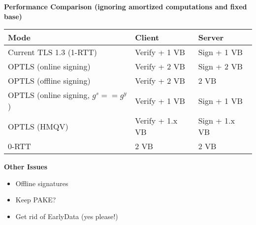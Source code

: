 \documentclass[helvetica]{seminar}
\newcommand{\heading}[1]{%
  \begin{center} 
    \large\bf 
    #1 
  \end{center} 
  \vspace{.4 in}}
\begin{document}
\begin{slide}
\heading{Performance Comparison (ignoring amortized computations and fixed base)}

\scriptsize{
\begin{tabular}{l l l}
Mode & Client & Server \\
\hline
Current TLS 1.3 (1-RTT) & Verify + 1 VB  & Sign + 1 VB  \\
OPTLS (online signing) & Verify + 2 VB  & Sign + 2 VB  \\
OPTLS (offline signing) & Verify + 2 VB  & 2 VB  \\
OPTLS (online signing, $g^s == g^y$) & Verify + 1 VB  & Sign + 1 VB  \\
OPTLS (HMQV) & Verify + 1.x VB  & Sign + 1.x VB  \\
0-RTT & 2 VB  & 2 VB  \\
\end{tabular}
}
\end{slide}

\begin{slide}
\heading{Other Issues}

\begin{itemize}
\item Offline signatures
\item Keep PAKE?
\item Get rid of EarlyData (yes please!)
\end{itemize}

\end{slide}
\end{document}
